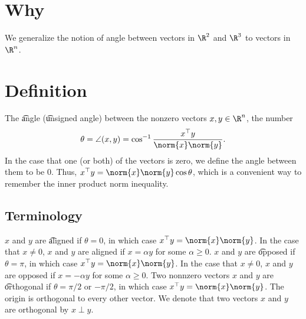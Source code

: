 
\section*{Why}

We generalize the notion of angle between vectors in $\R ^2$ and $\R ^3$ to vectors in $\R ^n$.

\section*{Definition}

The \t{angle} (\t{unsigned angle}) between the nonzero vectors $x, y \in \R ^n$, the number
  \[
\theta  = \angle(x,y) = \cos^{-1} \frac{x^\top y}{\norm{x}\norm{y}}.
  \]
In the case that one (or both) of the vectors is zero, we define the angle between them to be 0.
Thus, $x^\top y = \norm{x}\norm{y}\cos\theta $, which is a convenient way to remember the inner product norm inequality.

\subsection*{Terminology}

$x$ and $y$ are \t{aligned} if $\theta  = 0$, in which case $x^\top y = \norm{x}\norm{y}$.
In the case that $x \neq 0$, $x$ and $y$ are aligned if $x = \alpha y$ for some $\alpha  \geq 0$.
$x$ and $y$ are \t{opposed} if $\theta  = \pi $, in which case $x^\top y = \norm{x}\norm{y}$.
In the case that $x \neq 0$, $x$ and $y$ are opposed if $x = -\alpha y$ for some $\alpha  \geq 0$.
Two nonnzero vectors $x$ and $y$ are \t{orthogonal} if $\theta = \pi /2$ or $-\pi /2$, in which case $x^\top y = \norm{x}\norm{y}$.
The origin is orthogonal to every other vector.
We denote that two vectors $x$ and $y$ are orthogonal by $x \perp y$.
\blankpage
